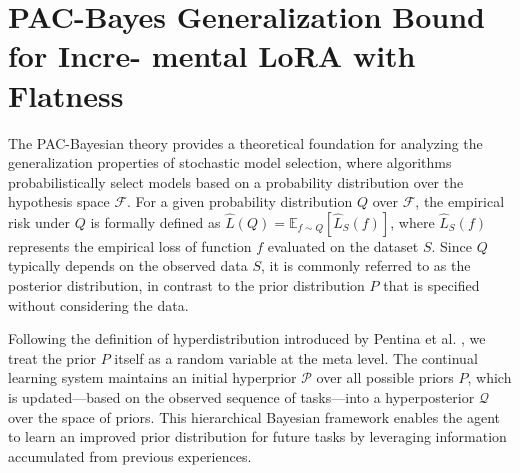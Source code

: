 \documentclass[letterpaper]{article} %
\begin{document}
\section{PAC-Bayes Generalization Bound for Incre-
mental LoRA with Flatness}



The PAC-Bayesian theory provides a theoretical foundation for analyzing the generalization properties of stochastic model selection, where algorithms probabilistically select models based on a probability distribution over the hypothesis space \(\mathcal{F}\). For a given probability distribution \(Q\) over \(\mathcal{F}\), the empirical risk under \(Q\) is formally defined as \(\hat{L}(Q) = \mathbb{E}_{f \sim Q}[\hat{L}_S(f)]\), where \(\hat{L}_S(f)\) represents the empirical loss of function \(f\) evaluated on the dataset \(S\). Since \(Q\) typically depends on the observed data \(S\), it is commonly referred to as the posterior distribution, in contrast to the prior distribution \(P\) that is specified without considering the data. 

Following the definition of hyperdistribution introduced by Pentina et al. , we treat the prior $P$ itself as a random variable at the meta level. The continual learning system maintains an initial hyperprior $\mathcal{P}$ over all possible priors $P$, which is updated—based on the observed sequence of tasks—into a hyperposterior $\mathcal{Q}$ over the space of priors. This hierarchical Bayesian framework enables the agent to learn an improved prior distribution for future tasks by leveraging information accumulated from previous experiences.
\end{document}
